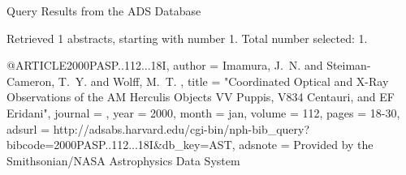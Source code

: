 Query Results from the ADS Database


Retrieved 1 abstracts, starting with number 1.  Total number selected: 1.

@ARTICLE{2000PASP..112...18I,
   author = {{Imamura}, J.~N. and {Steiman-Cameron}, T.~Y. and {Wolff}, M.~T.
	},
    title = "{Coordinated Optical and X-Ray Observations of the AM Herculis Objects VV Puppis, V834 Centauri, and EF Eridani}",
  journal = {\pasp},
     year = 2000,
    month = jan,
   volume = 112,
    pages = {18-30},
   adsurl = {http://adsabs.harvard.edu/cgi-bin/nph-bib_query?bibcode=2000PASP..112...18I&db_key=AST},
  adsnote = {Provided by the Smithsonian/NASA Astrophysics Data System}
}


